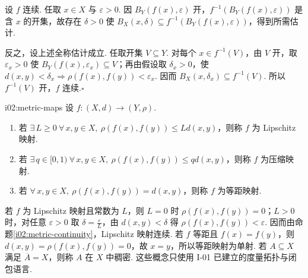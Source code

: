 \begin{FAProof}
设 \(\displaystyle f\) 连续. 任取 \(\displaystyle x\in X\) 与 \(\displaystyle \varepsilon>0\). 因 \(\displaystyle B_Y(f(x),\varepsilon)\) 开，\(\displaystyle f^{-1}(B_Y(f(x),\varepsilon))\) 是含 \(\displaystyle x\) 的开集，故存在 \(\displaystyle \delta>0\) 使 \(\displaystyle B_X(x,\delta)\subseteq f^{-1}(B_Y(f(x),\varepsilon))\)，得到所需估计.

反之，设上述全称估计成立. 任取开集 \(\displaystyle V\subseteq Y\). 对每个 \(\displaystyle x\in f^{-1}(V)\)，由 \(\displaystyle V\) 开，取 \(\displaystyle \varepsilon_x>0\) 使 \(\displaystyle B_Y(f(x),\varepsilon_x)\subseteq V\)；再由假设取 \(\displaystyle \delta_x>0\)，使 \(\displaystyle d(x,y)<\delta_x\Rightarrow \rho(f(x),f(y))<\varepsilon_x\). 因而 \(\displaystyle B_X(x,\delta_x)\subseteq f^{-1}(V)\). 所以 \(\displaystyle f^{-1}(V)\) 开，\(\displaystyle f\) 连续.\hfill\(\square\)
\end{FAProof}

\begin{FADefinition}{i02:metric-maps}
设 \(\displaystyle f:(X,d)\to(Y,\rho)\).
\begin{enumerate}[label=\textup{(\roman*)}]
\item 若 \(\displaystyle \exists\,L\geqslant0\ \forall\,x,y\in X,\ \rho(f(x),f(y))\leqslant Ld(x,y)\)，则称 \(\displaystyle f\) 为 Lipschitz 映射.
\item 若 \(\displaystyle \exists\,q\in[0,1)\ \forall\,x,y\in X,\ \rho(f(x),f(y))\leqslant qd(x,y)\)，则称 \(\displaystyle f\) 为压缩映射.
\item 若 \(\displaystyle \forall\,x,y\in X,\ \rho(f(x),f(y))=d(x,y)\)，则称 \(\displaystyle f\) 为等距映射.
\end{enumerate}
\end{FADefinition}

若 \(\displaystyle f\) 为 Lipschitz 映射且常数为 \(\displaystyle L\)，则 \(\displaystyle L=0\) 时 \(\displaystyle \rho(f(x),f(y))=0\)；\(\displaystyle L>0\) 时，对任意 \(\displaystyle \varepsilon>0\) 取 \(\displaystyle \delta=\frac{\varepsilon}{L}\)，由 \(\displaystyle d(x,y)<\delta\) 得 \(\displaystyle \rho(f(x),f(y))<\varepsilon\). 因而由命题\ref{i02:metric-continuity}，Lipschitz 映射连续. 若 \(\displaystyle f\) 等距且 \(\displaystyle f(x)=f(y)\)，则 \(\displaystyle d(x,y)=\rho(f(x),f(y))=0\)，故 \(\displaystyle x=y\)，所以等距映射为单射. 若 \(\displaystyle A\subseteq X\) 满足 \(\displaystyle \overline A=X\)，则称 \(\displaystyle A\) 在 \(\displaystyle X\) 中稠密. 这些概念只使用 I-01 已建立的度量拓扑与闭包语言.

